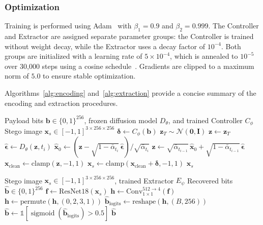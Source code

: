 \documentclass[conference]{IEEEtran}
\newcommand{\Ncal}{\mathcal{N}}
\DeclareMathOperator{\sigmoid}{sigmoid}
\begin{document}
\subsubsection{Optimization}
Training is performed using Adam~\cite{kingma2014adam} with $\beta_1 = 0.9$ and $\beta_2 = 0.999$.
The Controller and Extractor are assigned separate parameter groups: the Controller is trained without weight decay, while the Extractor uses a decay factor of $10^{-4}$.
Both groups are initialized with a learning rate of $5 \times 10^{-4}$, which is annealed to $10^{-5}$ over 30{,}000 steps using a cosine schedule~\cite{loshchilov2017sgdr}.
Gradients are clipped to a maximum norm of $5.0$ to ensure stable optimization.

Algorithms~\ref{alg:encoding} and~\ref{alg:extraction} provide a concise summary of the encoding and extraction procedures.

\begin{algorithm}[t]
\caption{DSCSP Encoding}
\label{alg:encoding}
\begin{algorithmic}[1]
\REQUIRE Payload bits $\mathbf{b} \in \{0,1\}^{256}$, frozen diffusion model $D_\theta$, and trained Controller $C_\phi$
\ENSURE Stego image $\mathbf{x}_s \in [-1, 1]^{3 \times 256 \times 256}$
\STATE $\bm{\delta} \leftarrow C_\phi(\mathbf{b})$ 
\STATE $\mathbf{z}_T \sim \Ncal(\mathbf{0}, \mathbf{I})$ 
\STATE $\mathbf{z} \leftarrow \mathbf{z}_T$
    \STATE $\hat{\bm{\epsilon}} \leftarrow D_\theta(\mathbf{z}, t_i)$ 
    \STATE $\hat{\mathbf{x}}_0 \leftarrow (\mathbf{z} - \sqrt{1 - \bar{\alpha}_{t_i}}\, \hat{\bm{\epsilon}}) / \sqrt{\bar{\alpha}_{t_i}}$
    \STATE $\mathbf{z} \leftarrow \sqrt{\bar{\alpha}_{t_{i-1}}}\, \hat{\mathbf{x}}_0 + \sqrt{1 - \bar{\alpha}_{t_{i-1}}}\, \hat{\bm{\epsilon}}$
\ENDFOR
\STATE $\mathbf{x}_\text{clean} \leftarrow \text{clamp}(\mathbf{z}, -1, 1)$
\STATE $\mathbf{x}_s \leftarrow \text{clamp}(\mathbf{x}_\text{clean} + \bm{\delta}, -1, 1)$
\RETURN $\mathbf{x}_s$
\end{algorithmic}
\end{algorithm}

\begin{algorithm}[t]
\caption{DSCSP Extraction}
\label{alg:extraction}
\begin{algorithmic}[1]
\REQUIRE Stego image $\mathbf{x}_s \in [-1, 1]^{3 \times 256 \times 256}$, trained Extractor $E_\psi$
\ENSURE Recovered bits $\hat{\mathbf{b}} \in \{0,1\}^{256}$
\STATE $\mathbf{f} \leftarrow \text{ResNet18}(\mathbf{x}_s)$ 
\STATE $\mathbf{h} \leftarrow \text{Conv}_{1\times1}^{512 \to 4}(\mathbf{f})$ 
\STATE $\mathbf{h} \leftarrow \text{permute}(\mathbf{h}, (0,2,3,1))$ 
\STATE $\hat{\mathbf{b}}_\text{logits} \leftarrow \text{reshape}(\mathbf{h}, (B, 256))$
\STATE $\hat{\mathbf{b}} \leftarrow \mathbb{1}[\sigmoid(\hat{\mathbf{b}}_\text{logits}) > 0.5]$ 
\RETURN $\hat{\mathbf{b}}$
\end{algorithmic}
\end{algorithm}
\end{document}
